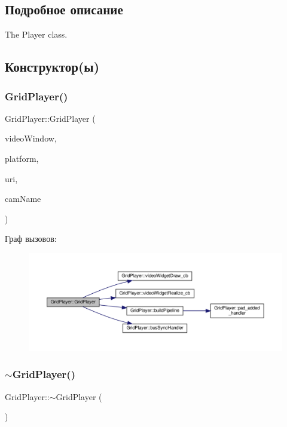 \subsection{Подробное описание}
The Player class. 

\subsection{Конструктор(ы)}
\mbox{\label{class_grid_player_a670153ae435e91f320cfeccf32e47aa1}} 
\subsubsection{\texorpdfstring{Grid\+Player()}{GridPlayer()}}
{\footnotesize\ttfamily Grid\+Player\+::\+Grid\+Player (\begin{DoxyParamCaption}\item[{Gtk\+Widget $\ast$}]{video\+Window,  }\item[{string}]{platform,  }\item[{string}]{uri,  }\item[{string}]{cam\+Name }\end{DoxyParamCaption})}

Граф вызовов\+:\nopagebreak
\begin{figure}[H]
\begin{center}
\leavevmode
\includegraphics[width=350pt]{class_grid_player_a670153ae435e91f320cfeccf32e47aa1_cgraph}
\end{center}
\end{figure}
\mbox{\label{class_grid_player_a4f64638cfd503340e6cf35a2991b449e}} 
\subsubsection{\texorpdfstring{$\sim$\+Grid\+Player()}{~GridPlayer()}}
{\footnotesize\ttfamily Grid\+Player\+::$\sim$\+Grid\+Player (\begin{DoxyParamCaption}{ }\end{DoxyParamCaption})}




